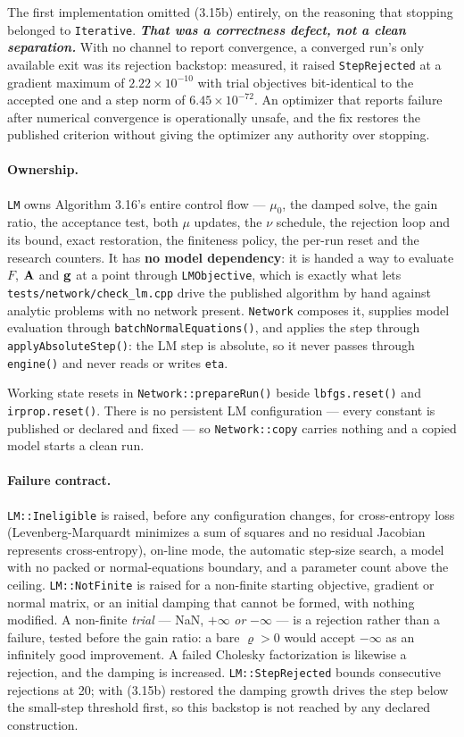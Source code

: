 The first implementation omitted (3.15b) entirely, on the reasoning that stopping
belonged to \texttt{Iterative}.  {\em \bf That was a correctness defect, not a
clean separation.}  With no channel to report convergence, a converged run's only
available exit was its rejection backstop: measured, it raised
\texttt{StepRejected} at a gradient maximum of $2.22\times10^{-10}$ with trial
objectives bit-identical to the accepted one and a step norm of
$6.45\times10^{-72}$.  An optimizer that reports failure after numerical
convergence is operationally unsafe, and the fix restores the published criterion
without giving the optimizer any authority over stopping.

\paragraph{Ownership.}  \texttt{LM} owns Algorithm 3.16's entire control flow ---
$\mu_0$, the damped solve, the gain ratio, the acceptance test, both $\mu$
updates, the $\nu$ schedule, the rejection loop and its bound, exact restoration,
the finiteness policy, the per-run reset and the research counters.  It has {\bf
no model dependency}: it is handed a way to evaluate $F$, ${\bf A}$ and ${\bf g}$
at a point through \texttt{LMObjective}, which is exactly what lets
\texttt{tests/network/check\_lm.cpp} drive the published algorithm by hand
against analytic problems with no network present.  \texttt{Network} composes it,
supplies model evaluation through \texttt{batchNormalEquations()}, and applies the
step through \texttt{applyAbsoluteStep()}: the LM step is absolute, so it never
passes through \texttt{engine()} and never reads or writes \texttt{eta}.

Working state resets in \texttt{Network::prepareRun()} beside
\texttt{lbfgs.reset()} and \texttt{irprop.reset()}.  There is no persistent LM
configuration --- every constant is published or declared and fixed --- so
\texttt{Network::copy} carries nothing and a copied model starts a clean run.

\paragraph{Failure contract.}  \texttt{LM::Ineligible} is raised, before any
configuration changes, for cross-entropy loss (Levenberg-Marquardt minimizes a
sum of squares and no residual Jacobian represents cross-entropy), on-line mode,
the automatic step-size search, a model with no packed or normal-equations
boundary, and a parameter count above the ceiling.  \texttt{LM::NotFinite} is
raised for a non-finite starting objective, gradient or normal matrix, or an
initial damping that cannot be formed, with nothing modified.  A non-finite
{\em trial} --- NaN, $+\infty$ {\em or} $-\infty$ --- is a rejection rather than
a failure, tested before the gain ratio: a bare $\varrho > 0$ would accept
$-\infty$ as an infinitely good improvement.  A failed Cholesky factorization is
likewise a rejection, and the damping is increased.  \texttt{LM::StepRejected}
bounds consecutive rejections at 20; with (3.15b) restored the damping growth
drives the step below the small-step threshold first, so this backstop is not
reached by any declared construction.

